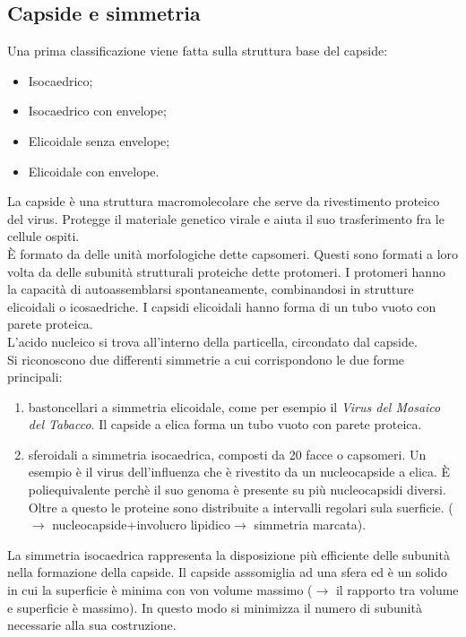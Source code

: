 \subsection{Capside e simmetria}
Una prima classificazione viene fatta sulla struttura base del capside:
\begin{itemize}
    \item Isocaedrico;
    \item Isocaedrico con envelope;
    \item Elicoidale senza envelope;
    \item Elicoidale con envelope.
\end{itemize}
La capside \`e una struttura macromolecolare che serve da rivestimento proteico del virus. Protegge il materiale genetico virale e aiuta il suo trasferimento fra le cellule ospiti.
\\\`E formato da delle unit\`a morfologiche dette capsomeri. Questi sono formati a loro volta da delle subunit\`a strutturali proteiche dette protomeri. I protomeri hanno la capacit\`a di autoassemblarsi spontaneamente, combinandosi in strutture elicoidali o icosaedriche. I capsidi elicoidali hanno forma di un tubo vuoto con parete proteica.
\\L'acido nucleico si trova all'interno della particella, circondato dal capside. 
\\Si riconoscono due differenti simmetrie a cui corrispondono le due forme principali:
\begin{enumerate}
    \item bastoncellari a simmetria elicoidale, come per esempio il \textit{Virus del Mosaico del Tabacco}. Il capside a elica forma un tubo vuoto con parete proteica. 
    \item sferoidali a simmetria isocaedrica, composti da 20 facce o capsomeri. Un esempio \`e il virus dell'influenza che \`e rivestito da un nucleocapside a elica. \`E poliequivalente perch\`e il suo genoma \`e presente su pi\`u nucleocapsidi diversi. Oltre a questo le proteine sono distribuite a intervalli regolari sula suerficie. ($\xrightarrow{}$ nucleocapside+involucro lipidico$\xrightarrow{}$ simmetria marcata).
\end{enumerate}
La simmetria isocaedrica rappresenta la disposizione pi\`u efficiente delle subunit\`a nella formazione della capside. Il capside asssomiglia ad una sfera ed \`e un solido in cui la superficie \`e minima con von volume massimo ($\xrightarrow{}$ il rapporto tra volume e superficie \`e massimo). In questo modo si minimizza il numero di subunit\`a necessarie alla sua costruzione.
